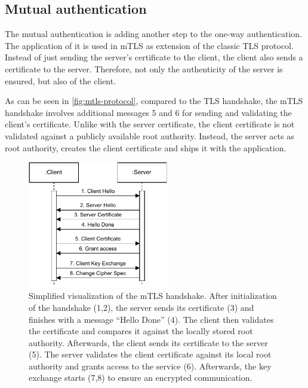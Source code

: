 \subsection{Mutual authentication}
The mutual authentication is adding another step to the one-way authentication. The application of it is used in \ac{mTLS} as extension of the classic \ac{TLS} protocol\cite{Rescorla.2018, HugoKrawczyk.2016}. Instead of just sending the server's certificate to the client, the client also sends a certificate to the server. Therefore, not only the authenticity of the server is ensured, but also of the client.

As can be seen in \autoref{fig:mtls-protocol}, compared to the \ac{TLS} handshake, the \ac{mTLS} handshake involves additional messages 5 and 6 for sending and validating the client's certificate.
Unlike with the server certificate, the client certificate is not validated against a publicly available root authority\cite{Cloudflare.20230309, Rescorla.2018}. Instead, the server acts as root authority, creates the client certificate and ships it with the application\cite{Cloudflare.20230309}.


\begin{figure}[h]
	\centering
	\includegraphics[width=0.55\textwidth]{Figures/mtls.pdf}
	\caption{Simplified visualization of the \ac{mTLS} handshake\cite{Cloudflare.20230309, Rescorla.2018}. After initialization of the handshake (1,2), the server sends its certificate (3) and finishes with a message \enquote{Hello Done} (4). The client then validates the certificate and compares it against the locally stored root authority. Afterwards, the client sends its certificate to the server (5). The server validates the client certificate against its local root authority and grants access to the service (6). Afterwards, the key exchange starts (7,8) to ensure an encrypted communication.}
	\label{fig:mtls-protocol}
\end{figure}

